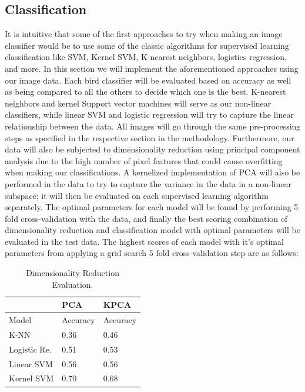\documentclass[11pt]{article}
\begin{document}
\begin{singlespace}
\subsection{Classification}
It is intuitive that some of the first approaches to try when making an image classifier would be to use some of the classic algorithms for supervised learning classification like SVM, Kernel SVM, K-nearest neighbors, logistics regression, and more. In this section we will implement the aforementioned approaches using our image data. Each bird classifier will be evaluated based on accuracy as well as being compared to all the others to decide which one is the best. K-nearest neighbors and kernel Support vector machines will serve as our non-linear classifiers, while linear SVM and logistic regression will try to capture the linear relationship between the data. All images will go through the same pre-processing steps as specified in the respective section in the methodology. Furthermore, our data will also be subjected to dimensionality reduction using principal component analysis due to the high number of pixel features that could cause overfitting when making our classifications. A kernelized implementation of PCA will also be performed in the data to try to capture the variance in the data in a non-linear subspace; it will then be evaluated on each supervised learning algorithm separately. The optimal parameters for each model will be found by performing 5 fold cross-validation with the data, and finally the best scoring combination of dimensionality reduction and classification model with optimal parameters will be evaluated in the test data. The highest scores of each model with it's optimal parameters from applying a grid search 5 fold cross-validation step are as follows: 

\begin{table}[h]
    \centering
    \begin{tabular}{ |M{2.5cm}|M{2cm}|M{2cm}|}
	 \hline
	 & PCA & KPCA \\
	 \hline
	 Model & Accuracy&Accuracy\\
	 \hline
	 K-NN & 0.36 &  0.46  \\
	 Logistic Re. & 0.51 & 0.53 \\
	 Linear SVM& 0.56 & 0.56 \\
	 Kernel SVM& 0.70 & 0.68 \\
	 \hline
   \end{tabular} \\
   \caption{Dimensionality Reduction Evaluation.}
\end{table}


\end{singlespace}
\end{document}
